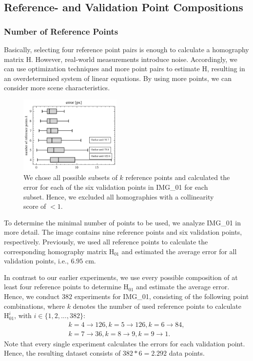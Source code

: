 \subsection{Reference- and Validation Point Compositions}

\subsubsection{Number of Reference Points}
Basically, selecting four reference point pairs is enough to calculate a 
homography matrix $\mathrm{H}$. However, real-world measurements introduce 
noise. Accordingly, we can use optimization techniques and more point 
pairs to estimate $\mathrm{H}$, resulting in an overdetermined system of 
linear equations. By using more points, we can consider more scene 
characteristics. 

\begin{figure}
	\centering
		\includegraphics[width=0.45\textwidth]{figures/boxplot_errors_by_k_filtered.png}
	\caption{We chose all possible subsets of $k$ reference points and 
	calculated the error for each of the six validation points in IMG\_01 
	for each subset. Hence, we excluded all homographies with a 
	collinearity score of $< 1$.}
	\label{fig:boxplot_error_by_k_filtered}
\end{figure}

To determine the minimal number of points to be used, we analyze IMG\_01 
in more detail. The image contains nine reference points and six validation 
points, respectively. Previously, we used all reference points to calculate 
the corresponding homography matrix $\mathrm{H}_{01}$ and estimated the 
average error for all validation points, i.e., $6.95$ cm. 

In contrast to our earlier experiments, we use every possible composition 
of at least four reference points to determine $\mathrm{H}_{01}$ and estimate 
the average error. Hence, we conduct $382$ experiments for IMG\_01, 
consisting of the following point combinations, where $k$ denotes the number 
of used reference points to calculate $\mathrm{H}_{01}^i$, with 
$i \in \{ 1, 2, ..., 382 \}$:
\begin{align*}
	k=4 \rightarrow 126, k=5 \rightarrow 126, k=6 \rightarrow 84, \\
	k=7 \rightarrow 36, k=8 \rightarrow 9, k=9 \rightarrow 1.	
\end{align*}
Note that every single experiment calculates the errors for each 
validation point. Hence, the resulting dataset consists of $382 * 6 = 2.292$ 
data points.

